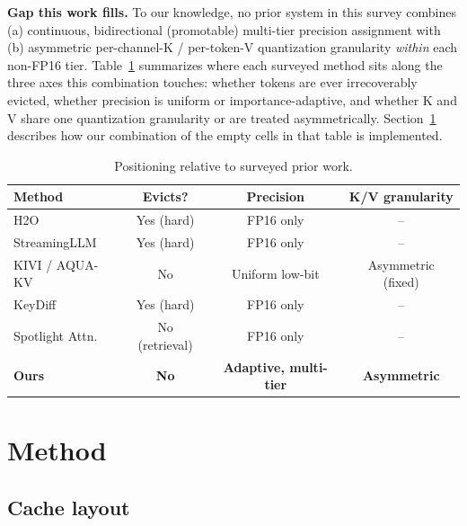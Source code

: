 \documentclass[conference]{IEEEtran}
\begin{document}
\textbf{Gap this work fills.} To our knowledge, no prior system in this survey combines
(a) continuous, bidirectional (promotable) multi-tier precision assignment with (b)
asymmetric per-channel-K / per-token-V quantization granularity \emph{within} each
non-FP16 tier. Table~\ref{tab:relatedwork} summarizes where each surveyed method sits
along the three axes this combination touches: whether tokens are ever irrecoverably
evicted, whether precision is uniform or importance-adaptive, and whether K and V
share one quantization granularity or are treated asymmetrically. Section~\ref{sec:method}
describes how our combination of the empty cells in that table is implemented.

\begin{table}[t]
\centering
\caption{Positioning relative to surveyed prior work.}
\label{tab:relatedwork}
\begin{tabular}{lccc}
\toprule
Method & Evicts? & Precision & K/V granularity \\
\midrule
H2O~\cite{h2o} & Yes (hard) & FP16 only & -- \\
StreamingLLM & Yes (hard) & FP16 only & -- \\
KIVI / AQUA-KV & No & Uniform low-bit & Asymmetric (fixed) \\
KeyDiff~\cite{keydiff} & Yes (hard) & FP16 only & -- \\
Spotlight Attn.~\cite{spotlight} & No (retrieval) & FP16 only & -- \\
\textbf{Ours} & \textbf{No} & \textbf{Adaptive, multi-tier} & \textbf{Asymmetric} \\
\bottomrule
\end{tabular}
\end{table}

\section{Method}
\label{sec:method}

\subsection{Cache layout}
\end{document}
